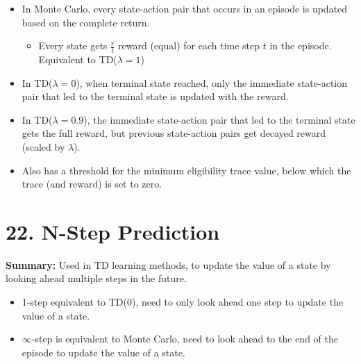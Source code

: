 \documentclass[letterpaper,10pt]{article}
\begin{document}
\begin{multicols}{2}
\begin{itemize}
    \item In Monte Carlo, every state-action pair that occurs in an episode is updated based on the complete return.
    \begin{itemize}
        \item Every state gets \( \frac{r}{t} \) reward (equal) for each time step \( t \) in the episode. Equivalent to TD(\( \lambda=1 \))
    \end{itemize}
    \item In TD(\( \lambda=0 \)), when terminal state reached, only the immediate state-action pair that led to the terminal state is updated with the reward.
    \item In TD(\( \lambda=0.9 \)), the immediate state-action pair that led to the terminal state gets the full reward, but previous state-action pairs get decayed reward (scaled by \( \lambda \)).
    \item Also has a threshold for the minimum eligibility trace value, below which the trace (and reward) is set to zero.
\end{itemize}

\section*{22. N-Step Prediction}
\textbf{Summary:} Used in TD learning methods, to update the value of a state by looking ahead multiple steps in the future.

\begin{itemize}
    \item 1-step equivalent to TD(0), need to only look ahead one step to update the value of a state.
    \item \( \infty \)-step is equivalent to Monte Carlo, need to look ahead to the end of the episode to update the value of a state.
\end{itemize}


\end{multicols}
\end{document}
